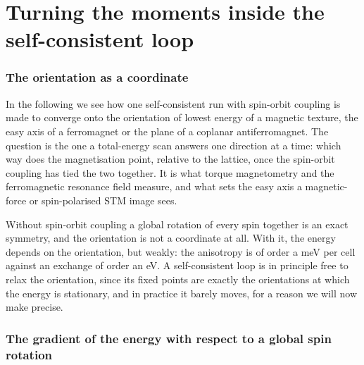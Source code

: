 \documentclass[11pt]{article}
\begin{document}
\part{Turning the moments inside the self-consistent loop}
\label{part:rotmom}

\section{The orientation as a coordinate}

In the following we see how one self-consistent run with spin-orbit coupling
is made to converge onto the orientation of lowest energy of a magnetic
texture, the easy axis of a ferromagnet or the plane of a coplanar
antiferromagnet. The question is the one a total-energy scan answers one
direction at a time: which way does the magnetisation point, relative to the
lattice, once the spin-orbit coupling has tied the two together. It is what
torque magnetometry and the ferromagnetic resonance field measure, and what
sets the easy axis a magnetic-force or spin-polarised STM image sees.

Without spin-orbit coupling a global rotation of every spin together is an
exact symmetry, and the orientation is not a coordinate at all. With it, the
energy depends on the orientation, but weakly: the anisotropy is of order a
meV per cell against an exchange of order an eV. A self-consistent loop is in
principle free to relax the orientation, since its fixed points are exactly
the orientations at which the energy is stationary, and in practice it barely
moves, for a reason we will now make precise.

\section{The gradient of the energy with respect to a global spin rotation}
\end{document}
